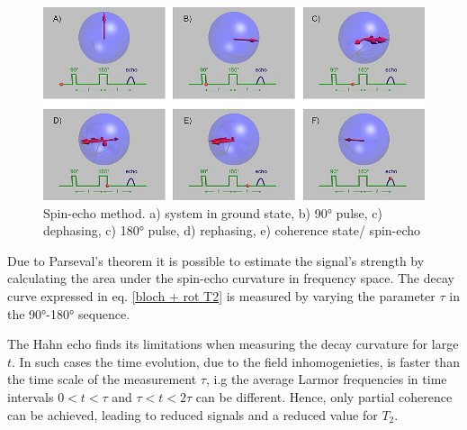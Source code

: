 \begin{figure}[!htbp]
 \begin{center}
  \includegraphics[width = .6\textwidth]{Latex images/SpinEcho_GWM_stills.jpg}
  \caption[]{Spin-echo method. a) system in ground state, b) 90° pulse, c) dephasing, c) 180° pulse, d) rephasing, e) coherence state/ spin-echo  \footnotemark}
    \label{fig: spin-echo}
 \end{center}
\end{figure}
Due to Parseval's theorem it is possible to estimate the signal's strength by calculating the area under the spin-echo curvature in frequency space.
The decay curve expressed in eq. \ref{bloch + rot T2} is measured by varying the parameter $\tau$ in the 90°-180° sequence.

The Hahn echo finds its limitations when measuring the decay curvature for large $t$. In such cases the time evolution, due to the field inhomogenieties, is faster than the time scale of the measurement $\tau$, i.g the average Larmor frequencies in time intervals $0 < t < \tau$ and $\tau < t < 2 \tau$ can be different. Hence, only partial coherence can be achieved, leading to reduced signals and a reduced value for $T_2$.

